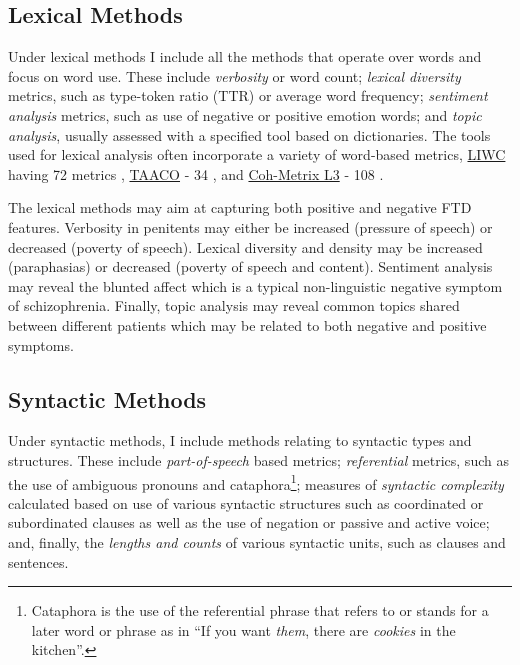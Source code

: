 \subsection{Lexical Methods}

Under lexical methods I include all the methods that operate over words and focus on word use. These include \textit{verbosity} or word count; \textit{lexical diversity} metrics, such as type-token ratio (TTR) or average word frequency; \textit{sentiment analysis} metrics, such as use of negative or positive emotion words; and \textit{topic analysis}, usually assessed with a specified tool based on dictionaries. The tools used for lexical analysis often incorporate a variety of word-based metrics, \href{https://www.liwc.app} {LIWC} having 72 metrics \citep{tausczik2010psychological}, \href{https://www.linguisticanalysistools.org/taaco.html}{TAACO} - 34 \citep{crossley2019tool}, and \href{http://cohmetrix.memphis.edu/cohmetrixhome/documentation_indices.html}{Coh-Metrix L3} - 108 \citep{mcnamara2014automated}. 

The lexical methods may aim at capturing both positive and negative FTD features. Verbosity in penitents may either be increased (pressure of speech) or decreased (poverty of speech). Lexical diversity and density may be increased (paraphasias) or decreased (poverty of speech and content). Sentiment analysis may reveal the blunted affect which is a typical non-linguistic negative symptom of schizophrenia. Finally, topic analysis may reveal common topics shared between different patients which may be related to both negative and positive symptoms.

\subsection{Syntactic Methods}

Under syntactic methods, I include methods relating to syntactic types and structures. These include \textit{part-of-speech} based metrics; \textit{referential} metrics, such as the use of ambiguous pronouns and cataphora\footnote{Cataphora is the use of the referential phrase that refers to or stands for a later word or phrase as in ``If you want \textit{them}, there are \textit{cookies} in the kitchen''.}; measures of \textit{syntactic complexity} calculated based on use of various syntactic structures such as coordinated or subordinated clauses as well as the use of negation or passive and active voice; and, finally, the \textit{lengths and counts} of various syntactic units, such as clauses and sentences.

